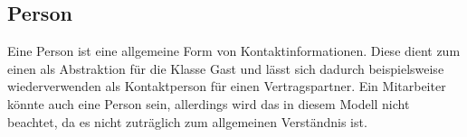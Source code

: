 \documentclass[../../Pflichtenheft.tex]{subfiles}
\begin{document}
    \subsection{Person}
    Eine Person ist eine allgemeine Form von Kontaktinformationen. Diese dient zum einen
    als Abstraktion für die Klasse Gast und lässt sich dadurch beispielsweise wiederverwenden
    als Kontaktperson für einen Vertragspartner. Ein Mitarbeiter könnte auch eine Person sein, allerdings
    wird das in diesem Modell nicht beachtet, da es nicht zuträglich zum allgemeinen Verständnis ist.
\end{document}
